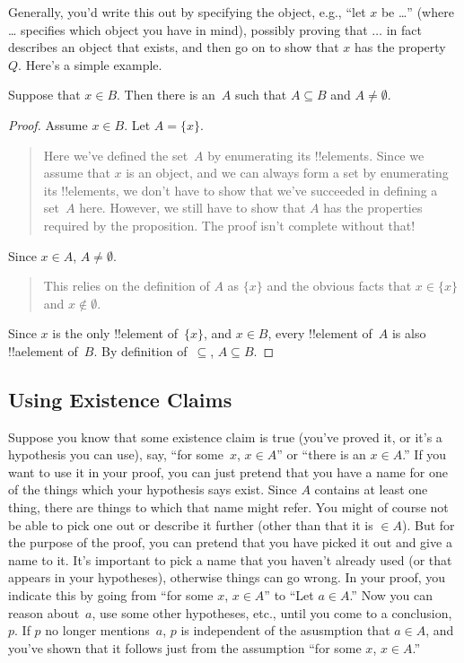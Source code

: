 \documentclass[../../../include/open-logic-section]{subfiles}
\begin{document}
Generally, you'd write this out by specifying the object, e.g., ``let
$x$ be \dots'' (where \dots{} specifies which object you have in
mind), possibly proving that $\dots$ in fact describes an object that
exists, and then go on to show that $x$ has the property~$Q$. Here's a
simple example.

\begin{prop}
  Suppose that $x \in B$. Then there is an~$A$ such that $A \subseteq
  B$ and $A \neq \emptyset$.
\end{prop}

\begin{proof}
  Assume $x \in B$. Let $A = \{x\}$.
  \begin{quote}
    Here we've defined the set~$A$ by enumerating its
    !!{element}s. Since we assume that $x$ is an object, and we can
    always form a set by enumerating its !!{element}s, we don't have
    to show that we've succeeded in defining a set~$A$ here.  However,
    we still have to show that $A$ has the properties required by the
    proposition. The proof isn't complete without that!{}
  \end{quote}
  Since $x \in A$, $A \neq \emptyset$.
  \begin{quote}
    This relies on the definition of $A$ as $\{x\}$ and the obvious
    facts that $x \in \{x\}$ and $x \notin \emptyset$.
  \end{quote}
  Since $x$ is the only !!{element} of~$\{x\}$, and $x \in B$, every
  !!{element} of~$A$ is also !!a{element} of~$B$. By definition
  of~$\subseteq$, $A \subseteq B$.
\end{proof}

\subsection{Using Existence Claims}

Suppose you know that some existence claim is true (you've proved it,
or it's a hypothesis you can use), say, ``for some~$x$, $x \in A$'' or
``there is an $x \in A$.''  If you want to use it in your proof, you
can just pretend that you have a name for one of the things which your
hypothesis says exist. Since $A$ contains at least one thing, there
are things to which that name might refer. You might of course not be
able to pick one out or describe it further (other than that it is
$\in A$). But for the purpose of the proof, you can pretend that you
have picked it out and give a name to it. It's important to pick a
name that you haven't already used (or that appears in your
hypotheses), otherwise things can go wrong. In your proof, you
indicate this by going from ``for some $x$, $x \in A$'' to ``Let $a
\in A$.''  Now you can reason about~$a$, use some other hypotheses, etc.,
until you come to a conclusion, $p$. If $p$ no longer mentions~$a$, $p$ is
independent of the asusmption that $a \in A$, and you've shown that it
follows just from the assumption ``for some $x$, $x \in A$.''
\end{document}

